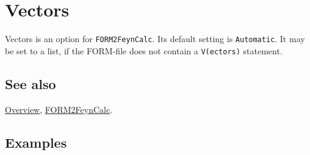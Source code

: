 \documentclass[../FeynCalcManual.tex]{subfiles}
\begin{document}
\hypertarget{vectors}{%
\section{Vectors}\label{vectors}}

Vectors is an option for \texttt{FORM2FeynCalc}. Its default setting is
\texttt{Automatic}. It may be set to a list, if the FORM-file does not
contain a \texttt{V(ectors)} statement.

\subsection{See also}

\hyperlink{toc}{Overview}, \hyperlink{form2feyncalc}{FORM2FeynCalc}.

\subsection{Examples}
\end{document}
